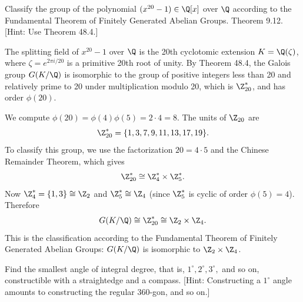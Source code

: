 \begin{problem}[48.2]
  Classify the group of the polynomial $(x^{20} - 1) \in \Q[x]$ over $\Q$ according to the Fundamental Theorem of Finitely Generated Abelian Groups. Theorem 9.12. [Hint: Use Theorem 48.4.]
\end{problem}

\begin{solution}
  The splitting field of $x^{20} - 1$ over $\Q$ is the 20th cyclotomic extension $K = \Q(\zeta)$, where $\zeta = e^{2\pi i/20}$ is a primitive 20th root of unity. By Theorem 48.4, the Galois group $G(K/\Q)$ is isomorphic to the group of positive integers less than 20 and relatively prime to 20 under multiplication modulo 20, which is $\Z_{20}^*$, and has order $\phi(20)$.

  We compute $\phi(20) = \phi(4)\phi(5) = 2 \cdot 4 = 8$. The units of $\Z_{20}$ are
  \[%
    \Z_{20}^* = \{1, 3, 7, 9, 11, 13, 17, 19\}
  .\]%
  To classify this group, we use the factorization $20 = 4 \cdot 5$ and the Chinese Remainder Theorem, which gives
  \[%
    \Z_{20}^* \cong \Z_4^* \times \Z_5^*
  .\]%
  Now $\Z_4^* = \{1, 3\} \cong \Z_2$ and $\Z_5^* \cong \Z_4$ (since $\Z_5^*$ is cyclic of order $\phi(5) = 4$). Therefore
  \[%
    G(K/\Q) \cong \Z_{20}^* \cong \Z_2 \times \Z_4
  .\]%
  This is the classification according to the Fundamental Theorem of Finitely Generated Abelian Groups: $G(K/\Q)$ is isomorphic to $\Z_2 \times \Z_4$.
\end{solution}

\begin{problem}[48.5]
  Find the smallest angle of integral degree, that is, $1^\circ, 2^\circ, 3^\circ,$ and so on, constructible with a straightedge and a compass. [Hint: Constructing a $1^\circ$ angle amounts to constructing the regular 360-gon, and so on.]
\end{problem}

